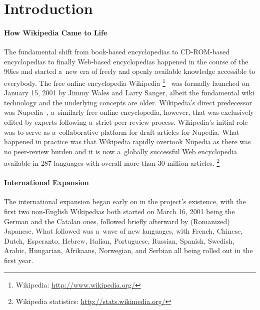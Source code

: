 \documentclass{sig-alternate}
\newcommand{\inlinelistingsize}{\fontsize{8pt}{11pt}}
\let\oldurl\url
\renewcommand{\url}[1]{\inlinelistingsize\oldurl{#1}}
\begin{document}



\section{Introduction}

\paragraph{How Wikipedia Came to Life}

The fundamental shift from book-based encyclopedias
to CD-ROM-based encyclopedias
to finally Web-based encyclopedias
happened in the course of the 90ies
and started a~new era of freely and openly
available knowledge accessible to everybody.
The free online encyclopedia Wikipedia%
\footnote{Wikipedia: \url{http://www.wikipedia.org/}}~\cite{sanger05historywikipedia} was formally launched
on January 15, 2001 by Jimmy Wales
and Larry Sanger,
albeit the fundamental wiki technology and the underlying concepts are older.
Wikipedia's direct predecessor was Nupedia~\cite{sanger05historywikipedia},
a~similarly free online encyclopedia,
however, that was exclusively edited by experts
following a~strict peer-review process.
Wikipedia's initial role was to serve
as a~collaborative platform for draft articles for Nupedia.
What happened in practice was that Wikipedia rapidly overtook Nupedia
as there was no peer-review burden
and it is now a~globally successful Web encyclopedia
available in 287 languages with overall more than 30 million articles.%
\footnote{Wikipedia statistics: \url{http://stats.wikimedia.org/}}

\paragraph{International Expansion}

The international expansion began early on
in the project's existence,
with the first two non-English Wikipedias both
started on March 16, 2001 being the German and the Catalan ones,
followed briefly afterward by (Romanized) Japanese.
What followed was a~wave of new languages,
with French, Chinese, Dutch, Esperanto, Hebrew,
Italian, Portuguese, Russian, Spanish, Swedish,
Arabic, Hungarian, Afrikaans, Norwegian, and Serbian all being rolled out in the first year.
\end{document}

